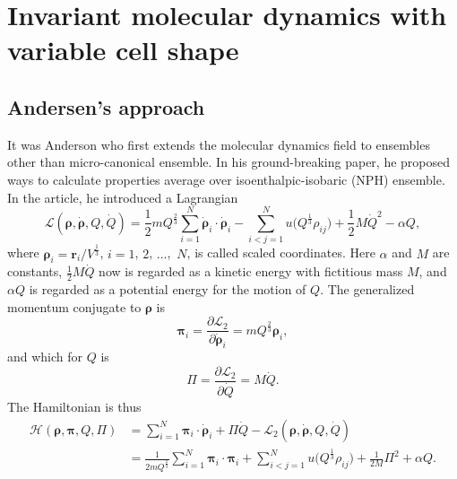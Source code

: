 
\section{Invariant molecular dynamics with variable cell shape}

\subsection{Andersen's approach}

It was Anderson who first extends the molecular dynamics field to
ensembles other than micro-canonical ensemble.\cite{Andersen:1980ew}
In his ground-breaking paper, he proposed ways to calculate properties average
over isoenthalpic-isobaric (NPH) ensemble. In the article, he introduced
a Lagrangian
\begin{equation}\label{eq:andersenlagrang}
	\mathcal{L}(\bm{\rho}, \dot{\bm{\rho}}, Q, \dot{ Q }) = \frac{ 1 }{ 2 } m
	Q^{\frac{ 2 }{ 3 }}
	\sum_{i=1}^{N} \dot{ \bm{\rho} }_i \cdot \dot{ \bm{\rho} }_i - \sum_{i<j=1}^{N}
	u \big(Q^{\frac{ 1 }{ 3 }} \rho_{ij} \big) + \frac{ 1 }{ 2 } M \dot{ Q } ^2 -
	\alpha Q,
\end{equation}
where $\bm{\rho}_i = \bm{r}_i / V ^{\frac{ 1 }{ 3 }}$, $i=1$, $2$, $\ldots$,~$N$,
is called scaled coordinates. Here $\alpha$ and $M$ are constants,
$\frac{ 1 }{ 2 } M \dot{ Q }$ now is regarded as a kinetic energy with fictitious
mass $M$,
and $\alpha Q$ is regarded as a potential energy for the motion of $Q$.
The generalized momentum conjugate to $\bm{\rho}$ is
\begin{equation}
	\bm{\pi}_i = \frac{ \partial \mathcal{L}_2 }{ \partial \dot{ \bm{\rho} }_i } =
	m Q^{\frac{ 2 }{ 3 }} \bm{\rho}_i,
\end{equation}
and which for $Q$ is
\begin{equation}
	\Pi = \frac{ \partial \mathcal{L}_2 }{ \partial \dot{Q} } = M \dot{ Q }.
\end{equation}
The Hamiltonian is thus
\begin{equation}
	\begin{split}
		\mathcal{H}(\bm{\rho}, \bm{\pi}, Q, \Pi) &= \sum_{i=1}^{N} \bm{\pi}_i \cdot
		\dot{ \bm{\rho} }_i + \Pi \dot{ Q } - \mathcal{L}_2
		(\bm{\rho}, \dot{\bm{\rho}}, Q, \dot{ Q })\\
		&= \frac{ 1 }{ 2 m Q^{\frac{ 2 }{ 3 }} }
		\sum_{i=1}^{N} \bm{\pi}_i \cdot \bm{\pi}_i
		+ \sum_{i<j=1}^{N} u\big(Q^{\frac{ 1 }{ 3 }} \rho_{ij}\big) + \frac{ 1 }{ 2 M }
		\Pi^2 + \alpha Q.
	\end{split}
\end{equation}
